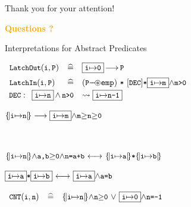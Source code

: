 \documentclass[11pt]{beamer}
\newcommand\orange[1]{\textcolor{orange}{\textbf{#1}}}
\begin{document}
\begin{frame}{Thank you for your attention!}
  \begin{center}
    \Large \orange{Questions ?}
  \end{center}
\end{frame}
\begin{frame}{Interpretations for Abstract Predicates}
\begin{small}
$
\begin{array}{lll}
\vspace{2mm}
 \LatchOut{i}{P} & \defs & \GLOBAL{i}{0} {\ourimply} \code{P}
\\
 \LatchIn{i}{P} &\defs &  (\code{P}{\septract}\emp) ~{\sep}~ [\DEC]  {\sep}\GLOBAL{i}{m} {\wedge}\code{m>0} 
 \\

\end{array}
$
$
\begin{array}{l}
\DEC: \begin{array}[t]{ll}
\GLOBAL{i}{n}\,{\wedge}\,\code{n{>}0} & \rightsquigarrow \GLOBAL{i}{n{-}1}
\end{array} \\
\end{array}\\
$
\end{small}
\pause
\vspace{2mm}
\begin{small}
$
\LOCAL{i}{n} \longrightarrow \GLOBALF{i}{m}{\code{m}{\geq}\code{n}{\geq}\code{0}}
$
\end{small} \\
\begin{small}
$
\LOCAL{i}{n}{\wedge}\code{a,b}{\geq}\code{0}{\wedge}{\code{n=a+b}}
~{\longleftrightarrow}~ \LOCAL{i}{a}{\sep}\LOCAL{i}{b} 
$
\end{small} 
\begin{small}
$
\GLOBAL{i}{a}{\sep}\GLOBAL{i}{b} 
~{\longleftrightarrow}~\GLOBAL{i}{a}{\wedge}\code{a{=}b}
$
\end{small}
\pause
\vspace{3mm}
\begin{small}
$
\begin{array}{lll}
\CNT{i}{n} &\defs & \LOCAL{i}{n} {\wedge}\code{n${\geq}$0}
~{\vee}~ \GLOBAL{i}{0}{\wedge}\code{n=-1} 
\end{array}
$
\end{small}

\end{frame}


\end{document}
